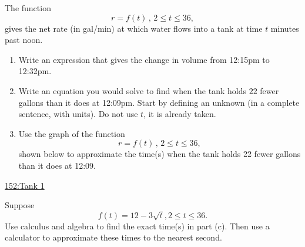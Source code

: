 \documentclass{ximera}
\begin{document}
\begin{question} \label{Q3edFGee}

The function
\[
 r =f(t) \, , \,  2 \leq t  \leq 36,
\]
 gives the net rate (in gal/min) at which water flows into a tank at time $t$ minutes past noon.

\begin{enumerate}
\item Write an expression that gives the change in volume from 12:15pm to 12:32pm.

\item Write an equation you would solve to find when the tank holds $22$ fewer gallons than it does at 12:09pm. Start by defining an unknown (in a complete sentence, with units). Do not use $t$, it is already taken.

\item Use the graph of the function
 \[
 r =f(t) \, , \,  2 \leq t  \leq 36,
\]
 shown below to approximate the time(s) when the tank holds 22 fewer gallons than it does at 12:09. 
\end{enumerate}

\begin{onlineOnly}
    \begin{center}
\end{center}
\end{onlineOnly}

\href{https://www.desmos.com/calculator/rcsfzdhsax}{152:Tank 1}

\item Suppose 
\[
     f(t) = 12 - 3\sqrt{t} , 2\leq t \leq 36 .
\] 
Use calculus and algebra to find the exact time(s) in part (c). Then use a calculator to approximate these times to the nearest second.
\end{question}
\end{document}
